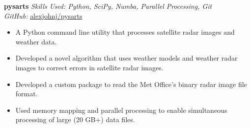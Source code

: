 \textbf{pysarts}  \newline
\textit{Skills Used: Python, SciPy, Numba, Parallel Processing, Git}\\
\textit{GitHub:} \href{https://github.com/\myweb/pysarts}{alexjohnj/pysarts}
\begin{itemize}[leftmargin=0mm]
  \item A Python command line utility that processes satellite radar images and
    weather data.
  \item Developed a novel algorithm that uses weather models and weather radar
    images to correct errors in satellite radar images.
  \item Developed a custom package to read the Met Office's binary radar image
    file format.
  \item Used memory mapping and parallel processing to enable simultaneous
    processing of large (20 GB+) data files.
\end{itemize}

